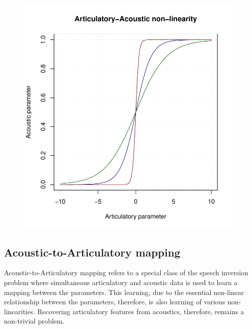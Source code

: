 \documentclass{article}[12pt]
\begin{document}
\begin{figure}[h]
\includegraphics[scale=0.80]{sigmoid.pdf}
\label{Fig.1}
\end{figure}
\subsection{Acoustic-to-Articulatory mapping}
Acoustic-to-Articulatory mapping refers to a special class of the speech inversion problem where simultaneous articulatory and acoustic data is used to learn a mapping between the parameters. This learning, due to the essential non-linear relationship between the parameters, therefore, is also learning of various non-linearities. Recovering articulatory features from acoustics, therefore, remains a non-trivial problem.
\cite{toutios2003}
\cite{badino2016,canevari2013,cernak2016}


\end{document}
